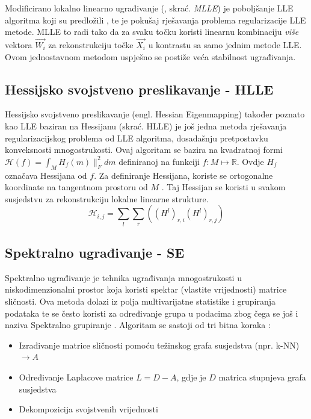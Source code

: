 \documentclass[times, utf8, diplomski]{fer}
\begin{document}
Modificirano lokalno linearno ugrađivanje (, skrać. \emph{MLLE}) je poboljšanje LLE algoritma koji su predložili \cite{zhang2007mlle}, te je pokušaj rješavanja problema regularizacije LLE metode. MLLE to radi tako da za svaku točku koristi linearnu kombinaciju \emph{više} vektora $\vec{W_{i}}$ za rekonstrukciju točke $\vec{X_i}$ u kontrastu sa samo jednim metode LLE. Ovom jednostavnom metodom uspješno se postiže veća stabilnost ugrađivanja.

\subsection{Hessijsko svojstveno preslikavanje - HLLE}

Hessijsko svojstveno preslikavanje (engl. Hessian Eigenmapping) također poznato kao LLE baziran na Hessijanu (skrać. HLLE) je još jedna metoda rješavanja regularizacijskog problema od LLE algoritma, dosadašnju pretpostavku konveksnosti mnogostrukosti. Ovaj algoritam se bazira na kvadratnoj formi $\mathcal{H}(f) = \int_M H_f(m)\|_F^2 dm$ definiranoj na funkciji $f: M \mapsto \mathbb{R}$. Ovdje $H_f$ označava Hessijana od $f$. Za definiranje Hessijana, koriste se ortogonalne koordinate na tangentnom prostoru od $M$ \citep{Donoho5591}. Taj Hessijan se koristi u svakom susjedstvu za rekonstrukciju lokalne linearne strukture.
\begin{equation}
    \mathcal{H}_{i,j} = \sum_l \sum_r ((H^l)_{r,i}(H^l)_{r,j})
\end{equation}


\subsection{Spektralno ugrađivanje - SE}
Spektralno ugrađivanje  je tehnika ugrađivanja mnogostrukosti u niskodimenzionalni prostor koja koristi spektar (vlastite vrijednosti) matrice sličnosti. Ova metoda dolazi iz polja multivarijatne statistike i grupiranja podataka te se često koristi za određivanje  grupa u podacima zbog čega se još i naziva Spektralno grupiranje . Algoritam se sastoji od tri bitna koraka \citep{belkin2003laplacian}:
\begin{itemize}
    \item Izrađivanje matrice sličnosti pomoću težinskog grafa susjedstva (npr. k-NN) $\rightarrow A$
    \item Određivanje Laplacove matrice $L = D - A$, gdje je $D$ matrica stupnjeva grafa susjedstva
    \item Dekompozicija svojstvenih vrijednosti 
\end{itemize}
\end{document}
